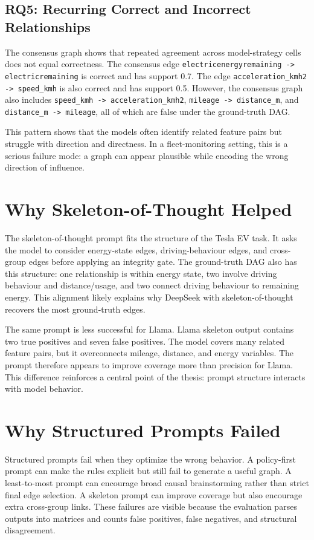 \subsection{RQ5: Recurring Correct and Incorrect Relationships}

The consensus graph shows that repeated agreement across model-strategy cells
does not equal correctness. The consensus edge
\texttt{electricenergyremaining -> electricremaining} is correct and has
support 0.7. The edge \texttt{acceleration\_kmh2 -> speed\_kmh} is also
correct and has support 0.5. However, the consensus graph also includes
\texttt{speed\_kmh -> acceleration\_kmh2}, \texttt{mileage -> distance\_m},
and \texttt{distance\_m -> mileage}, all of which are false under the
ground-truth DAG.

This pattern shows that the models often identify related feature pairs but
struggle with direction and directness. In a fleet-monitoring setting, this is
a serious failure mode: a graph can appear plausible while encoding the wrong
direction of influence.

\section{Why Skeleton-of-Thought Helped}

The skeleton-of-thought prompt fits the structure of the Tesla EV task. It
asks the model to consider energy-state edges, driving-behaviour edges, and
cross-group edges before applying an integrity gate. The ground-truth DAG also
has this structure: one relationship is within energy state, two involve
driving behaviour and distance/usage, and two connect driving behaviour to
remaining energy. This alignment likely explains why DeepSeek with
skeleton-of-thought recovers the most ground-truth edges.

The same prompt is less successful for Llama. Llama skeleton output contains
two true positives and seven false positives. The model covers many related
feature pairs, but it overconnects mileage, distance, and energy variables.
The prompt therefore appears to improve coverage more than precision for
Llama. This difference reinforces a central point of the thesis: prompt
structure interacts with model behavior.

\section{Why Structured Prompts Failed}

Structured prompts fail when they optimize the wrong behavior. A policy-first
prompt can make the rules explicit but still fail to generate a useful graph.
A least-to-most prompt can encourage broad causal brainstorming rather than
strict final edge selection. A skeleton prompt can improve coverage but also
encourage extra cross-group links. These failures are visible because the
evaluation parses outputs into matrices and counts false positives, false
negatives, and structural disagreement.

